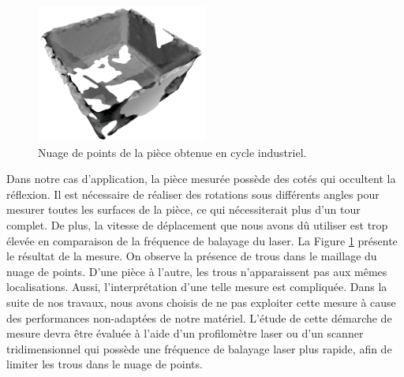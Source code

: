 \begin{figure}[hbtp]
	\centering
	\includegraphics[width=0.5\textwidth]{../Chap2/Figures/online_3d_scan.png}
	\caption{Nuage de points de la pièce obtenue en cycle industriel.}
	\label{fig:online_scan_result}
\end{figure}
Dans notre cas d'application, la pièce mesurée possède des cotés qui occultent la réflexion.
Il est nécessaire de réaliser des rotations sous différents angles pour mesurer toutes les surfaces de la pièce, ce qui nécessiterait plus d'un tour complet.
De plus, la vitesse de déplacement que nous avons dû utiliser est trop élevée en comparaison de la fréquence de balayage du laser.
La Figure \ref{fig:online_scan_result} présente le résultat de la mesure.
On observe la présence de trous dans le maillage du nuage de points.
D'une pièce à l'autre, les trous n'apparaissent pas aux mêmes localisations.
Aussi, l'interprétation d'une telle mesure est compliquée. 
Dans la suite de nos travaux, nous avons choisis de ne pas exploiter cette mesure à cause des performances non-adaptées de notre matériel.
L'étude de cette démarche de mesure devra être évaluée à l'aide d'un profilomètre laser ou d'un scanner tridimensionnel qui possède une fréquence de balayage laser plus rapide, afin de limiter les trous dans le nuage de points.

